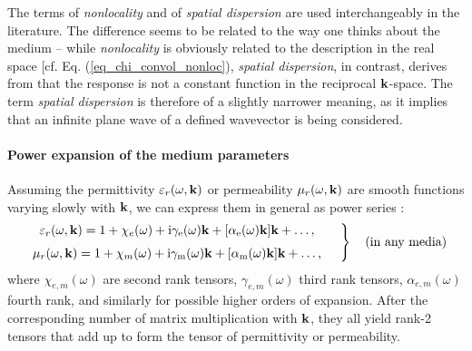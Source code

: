 The terms of \textit{nonlocality} and of \textit{spatial dispersion} are used interchangeably in the literature. The difference seems to be related to the way one thinks about the medium -- while \textit{nonlocality} is obviously related to the description in the real space [cf. Eq. (\ref{eq_chi_convol_nonloc}), \textit{spatial dispersion}, in contrast, derives from that the response is not a constant function in the reciprocal ${\mathbf{k}}$-space. The term \textit{spatial dispersion} is therefore of a slightly narrower meaning, as it implies that an infinite plane wave of a defined wavevector is being considered.

\paragraph{Power expansion of the medium parameters} %
Assuming the permittivity $\varepsilon_r(\omega,{\mathbf{k}})$ or permeability $\mu_r(\omega,{\mathbf{k}})$ are smooth functions varying slowly with ${\mathbf{k}}$, we can express them in general as power series \cite[p. 367]{landau1984electrodynamics}:
\begin{equation} 
\left.  \begin{array}{c}
\epsrn(\omega,\kk) = 1 + \chi_e(\omega) + \ii \gamma_{\text{e}}(\omega) \kk + [\alpha_{\text{e}}(\omega) \kk] \kk + \ldots, \medskip  \\
\murn(\omega,\kk) = 1 + \chi_m(\omega) + \ii \gamma_{\text{m}}(\omega) \kk + [\alpha_{\text{m}}(\omega) \kk] \kk + \ldots, 
\end{array} \quad \right\} \quad \text{(in any media)}
\label{eq_epsmusd1}\end{equation} %
where $\chi_{e,m}(\omega)$ are second rank tensors, $\gamma_{e,m}(\omega)$ third rank tensors, $\alpha_{e,m}(\omega)$ fourth rank, and similarly for possible higher orders of expansion. After the corresponding number of matrix multiplication with ${\mathbf{k}}$, they all yield rank-2 tensors that add up to form the tensor of permittivity or permeability.

